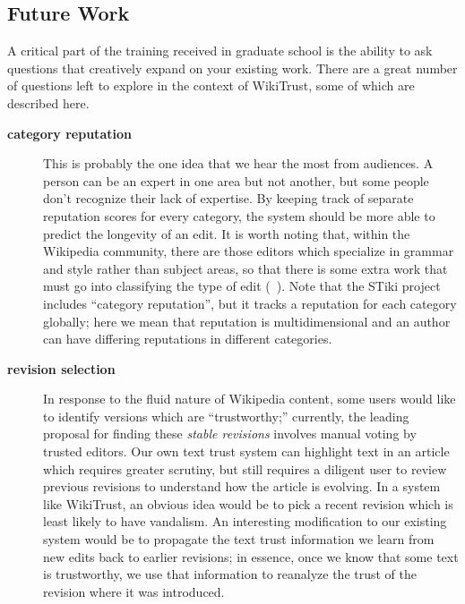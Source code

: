 \subsection{Future Work}

A critical part of the training received in graduate school
is the ability to ask questions that creatively expand on your
existing work.
There are a great number of questions left to explore in the
context of WikiTrust, some of which are described here.

\begin{description}
\item[\textbf{category reputation}]
    This is probably the one idea that we hear the most from audiences.
    A person can be
    an expert in one area but not another, but some people don't
    recognize their lack of expertise.
    By keeping track of separate reputation scores for every category,
    the system should be more able to predict the longevity of an edit.
    It is worth noting that, within the Wikipedia community, there
    are those editors which specialize in grammar and style rather than
    subject areas, so that there is some extra work that must go
    into classifying the type of edit (\eg~\cite{Fong2010}).
    Note that the STiki project~\cite{West2010} includes ``category
    reputation'', but it tracks a reputation for each category globally;
    here we mean that reputation is multidimensional and an author can
    have differing reputations in different categories.

\item[\textbf{revision selection}]
   In response to the fluid nature of Wikipedia content,
    some users would like to identify versions which
    are ``trustworthy;'' currently, the leading proposal
    for finding these \textit{stable revisions}
    involves manual voting by trusted editors.
    Our own text trust system can highlight text in
    an article which requires greater scrutiny, but
    still requires a diligent user to review previous
    revisions to understand how the article is evolving.
    In a system like WikiTrust, an obvious idea would be to pick
    a recent revision which is least likely to have vandalism.
    An interesting modification to our existing system would be
    to propagate the text trust information we learn from new edits
    back to earlier revisions; in essence, once we know that some
    text is trustworthy, we use that information to reanalyze the
    trust of the revision where it was introduced.


\end{description}
